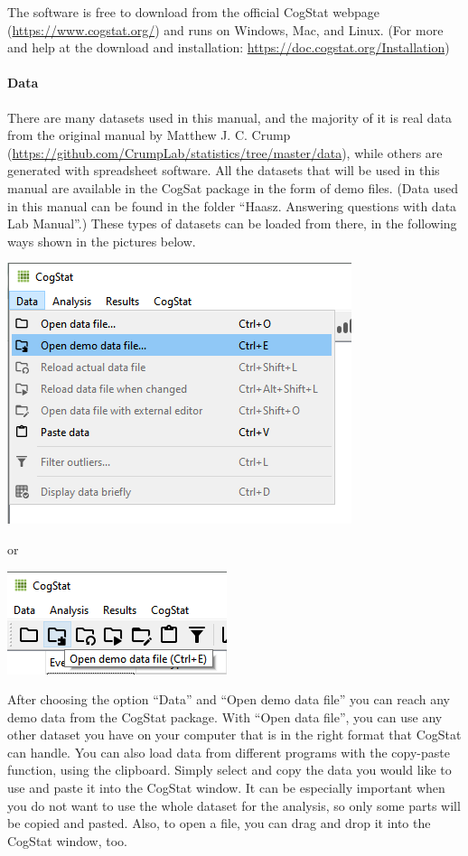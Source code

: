 \documentclass[
]{book}
\begin{document}
The software is free to download from the official CogStat webpage (\url{https://www.cogstat.org/}) and runs on Windows, Mac, and Linux. (For more and help at the download and installation: \url{https://doc.cogstat.org/Installation})

\hypertarget{data-1}{%
\paragraph{Data}\label{data-1}}

There are many datasets used in this manual, and the majority of it is real data from the original manual by Matthew J. C. Crump (\url{https://github.com/CrumpLab/statistics/tree/master/data}), while others are generated with spreadsheet software. All the datasets that will be used in this manual are available in the CogSat package in the form of demo files. (Data used in this manual can be found in the folder ``Haasz. Answering questions with data Lab Manual''.) These types of datasets can be loaded from there, in the following ways shown in the pictures below.

\includegraphics{img/intro/opendemodata_menu.png}

or

\includegraphics{img/intro/opendemodata_icon.png}

After choosing the option ``Data'' and ``Open demo data file'' you can reach any demo data from the CogStat package. With ``Open data file'', you can use any other dataset you have on your computer that is in the right format that CogStat can handle. You can also load data from different programs with the copy-paste function, using the clipboard. Simply select and copy the data you would like to use and paste it into the CogStat window. It can be especially important when you do not want to use the whole dataset for the analysis, so only some parts will be copied and pasted. Also, to open a file, you can drag and drop it into the CogStat window, too.
\end{document}
